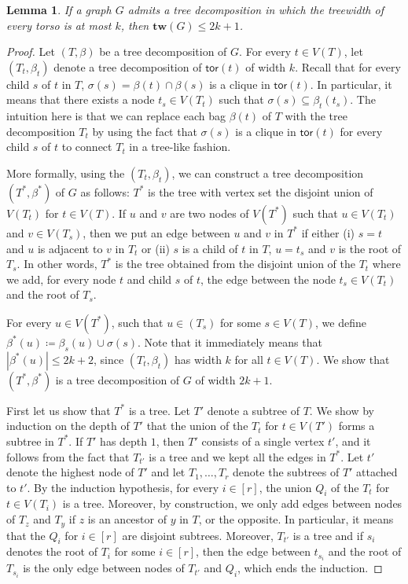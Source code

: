 \documentclass[a4paper,11pt]{article}
\newtheorem{lemma}{Lemma}
\numberwithin{lemma}{section}
\newcommand{\tw}{\mathbf{tw}}
\newcommand{\tor}{\mathsf{tor}}
\begin{document}
\begin{lemma} \label{lem-torsotw}
 If a graph $G$ admits a tree decomposition in which the treewidth of every torso is at most $k$, then $\tw(G) \leq 2k+1$.
\end{lemma}
\begin{proof}
 Let $(T, \beta)$  be a tree decomposition of $G$. For every $t \in V(T)$, let $(T_t, \beta_t)$ denote a tree decomposition of $\tor(t)$ of width $k$.
 Recall that for every child $s$ of $t$ in $T$, $\sigma(s) = \beta(t) \cap \beta(s)$ is a clique in $\tor(t)$.
 In particular, it means that there exists a node $t_s \in V(T_t)$ such that $\sigma(s) \subseteq \beta_t(t_s)$.
 The intuition here is that we can replace each bag $\beta(t)$ of $T$ with the tree decomposition $T_t$ by using the fact that $\sigma(s)$ is a clique in $\tor(t)$ for every child $s$ of $t$ to connect $T_t$ in a tree-like fashion.

 More formally, using the $(T_t, \beta_t)$, we can construct a tree decomposition $(T^*, \beta^*)$ of $G$ as follows: $T^*$ is the tree with vertex set the disjoint union of $V(T_t)$ for $t \in V(T)$.
 If $u$ and $v$ are two nodes of $V(T^*)$ such that $u \in V(T_t)$ and $v \in V(T_s)$, then we put an edge between $u$ and $v$ in $T^*$ if either (i) $s = t$ and $u$ is adjacent to
 $v$ in $T_t$ or (ii) $s$ is a child of $t$ in $T$, $u = t_s$ and $v$ is the root of $T_s$.
 In other words, $T^*$ is the tree obtained from the disjoint union of the $T_t$ where we add, for every node $t$ and child $s$ of $t$, the edge between the node $t_s \in V(T_t)$ and the root of $T_s$.

 For every $u \in V(T^*)$, such that $u \in (T_s)$ for some $s \in V(T)$, we define $\beta^*(u) \coloneqq \beta_s(u) \cup \sigma(s)$.
 Note that it immediately means that $|\beta^*(u)| \leq 2k+2$, since $(T_t, \beta_t)$ has width $k$ for all $t \in V(T)$.
 We show that $(T^*, \beta^*)$ is a tree decomposition of $G$ of width $2k+1$.

 First let us show that $T^*$ is a tree.
 Let $T'$ denote a subtree of $T$.
 We show by induction on the depth of $T'$ that the union of the $T_t$ for $t \in V(T')$ forms a subtree in $T^*$.
 If $T'$ has depth $1$, then $T'$ consists of a single vertex $t'$, and it follows from the fact that $T_{t'}$ is a tree and we kept all the edges in $T^*$.
 Let $t'$ denote the highest node of $T'$ and let $T_1,\dots, T_r$ denote the subtrees of $T'$ attached to $t'$.
 By the induction hypothesis, for every $i \in [r]$, the union $Q_i$ of the $T_t$ for $t \in V(T_i)$ is a tree.
 Moreover, by construction, we only add edges between nodes of $T_z$ and $T_y$ if $z$ is an ancestor of $y$ in $T$, or the opposite.
 In particular, it means that the $Q_i$ for $i \in [r]$ are disjoint subtrees.
 Moreover, $T_{t'}$ is a tree and if $s_i$ denotes the root of $T_i$ for some $i \in [r]$, then the edge between $t_{s_i}$ and the root of $T_{s_i}$ is the only edge between nodes of $T_{t'}$ and $Q_i$, which ends the induction.


\end{proof}
\end{document}
